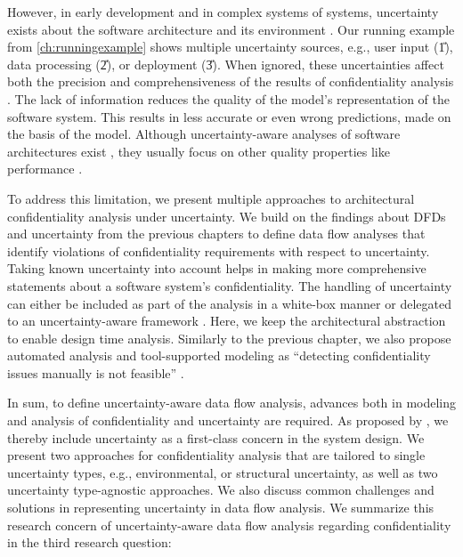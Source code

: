 However, in early development and in complex systems of systems, uncertainty exists about the software architecture and its environment \cite{acosta_uncertainty_2022}.
Our running example from \autoref{ch:runningexample} shows multiple uncertainty sources, e.g., user input (\U{1}), data processing (\U{2}), or deployment (\U{3}).
When ignored, these uncertainties affect both the precision and comprehensiveness of the results of confidentiality analysis \cite{hahner_classification_2023,hahner_dealing_2021,hahner_architectural_2021}.
The lack of information reduces the quality of the model's representation of the software system. 
This results in less accurate or even wrong predictions, made on the basis of the model. 
Although uncertainty-aware analyses of software architectures exist \cite{esfahani_guidearch_2013}, they usually focus on other quality properties like performance \cite{sobhy_evaluation_2021}.

To address this limitation, we present multiple approaches to architectural confidentiality analysis under uncertainty.
We build on the findings about \acp{DFD} and uncertainty from the previous chapters to define data flow analyses that identify violations of confidentiality requirements with respect to uncertainty.
Taking known uncertainty into account helps in making more comprehensive statements about a software system's confidentiality.
The handling of uncertainty can either be included as part of the analysis in a white-box manner or delegated to an uncertainty-aware framework \cite{acosta_uncertainty_2022}.
Here, we keep the architectural abstraction to enable design time analysis.
Similarly to the previous chapter, we also propose automated analysis and tool-supported modeling as \enquote{detecting confidentiality issues manually is not feasible} \cite{seifermann_data-driven_2019}.

In sum, to define uncertainty-aware data flow analysis, advances both in modeling and analysis of confidentiality and uncertainty are required.
As proposed by \textcite{garlan_software_2010}, we thereby include uncertainty as a first-class concern in the system design.
We present two approaches for confidentiality analysis that are tailored to single uncertainty types, e.g., environmental, or structural uncertainty, as well as two uncertainty type-agnostic approaches.
We also discuss common challenges and solutions in representing uncertainty in data flow analysis.
We summarize this research concern of uncertainty-aware data flow analysis regarding confidentiality in the third research question:

